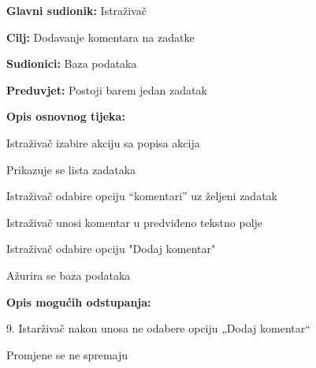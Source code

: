 					\noindent {}
					\begin{packed_item}
	
						\item \textbf{Glavni sudionik: } Istraživač
						\item  \textbf{Cilj:} Dodavanje komentara na zadatke
						\item  \textbf{Sudionici:} Baza podataka
						\item  \textbf{Preduvjet:} Postoji barem jedan zadatak
						\item  \textbf{Opis osnovnog tijeka:}
						
						\item[] \begin{packed_enum}
						
							\item   Istraživač izabire akciju sa popisa akcija
							\item   Prikazuje se lista zadataka 
							\item 	Istraživač odabire opciju “komentari” uz željeni zadatak
							\item 	Istraživač unosi komentar u predviđeno tekstno polje 
							\item 	Istraživač odabire opciju "Dodaj komentar"
							\item 	Ažurira se baza podataka
							
						\end{packed_enum}
						\item  \textbf{Opis mogućih odstupanja:}
						
						\item[] \begin{packed_item}
	
							\item[4.a] 9.	Istarživač nakon unosa ne odabere opciju „Dodaj komentar“
							\item[] \begin{packed_enum}
								\item Promjene se ne spremaju
							\end{packed_enum}

						\end{packed_item}
					\end{packed_item}%
